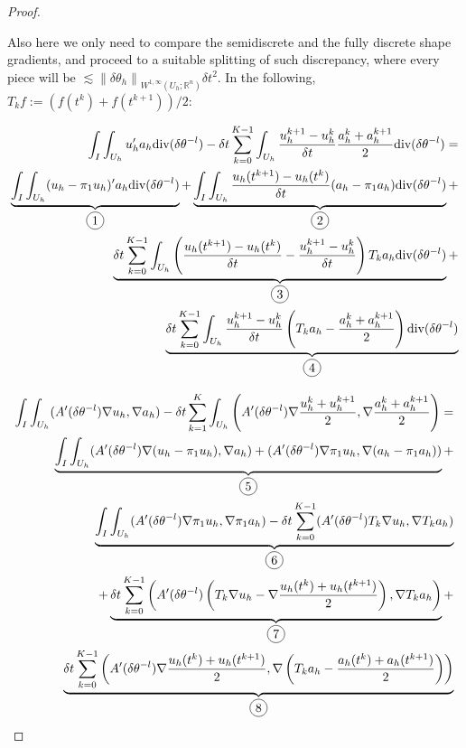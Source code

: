 \documentclass[english,a4paper,10pt,oneside]{scrbook}	%
\theoremstyle{break}
\newenvironment{mproof}[1][\proofname]{%
  \begin{proof}[#1]$ $\par\nobreak\ignorespaces
}{%
  \end{proof}
}
\renewcommand*{\proofname}{Proof}
\theoremstyle{remark}
\newcommand{\mR}{\mathbb{R}}
\newcommand{\norm}[1]{\left\lVert#1\right\rVert}
\newcommand{\te}{\theta}
\newcommand{\dive}{\text{div}}
\newcommand*\circled[1]{\tikz[baseline=(char.base)]{
            \node[shape=circle,draw,inner sep=2pt] (char) {#1};}}
\begin{document}
\begin{mproof}
Also here we only need to compare the semidiscrete and the fully discrete shape gradients, and proceed to a suitable splitting of such discrepancy, where every piece will be $\lesssim \norm{\delta \te_h}_{W^{1,\infty}(U_h;\mR^n)} \delta t^2$. In the following, $T_k f := (f(t^k)+f(t^{k+1}))/2$:

\begin{align*}
\int_I\int_{U_h}u_h'a_h\dive(\delta \te^{-l})-\delta t \sum_{k=0}^{K-1} \int_{U_h} \frac{u_h^{k+1}-u_h^{k}}{\delta t}\frac{a_h^k+a_h^{k+1}}{2} \dive(\delta \te^{-l}) =  \\
\underbrace{\int_I\int_{U_h}(u_h-\pi_1 u_h)'a_h\dive(\delta \te^{-l})}_{\circled{1}} + \underbrace{\int_I\int_{U_h}\frac{u_h(t^{k+1})-u_h(t^{k})}{\delta t} (a_h-\pi_1 a_h)\dive(\delta \te^{-l})}_{\circled{2}} +\\
\underbrace{\delta t \sum_{k=0}^{K-1} \int_{U_h}\left (\frac{u_h(t^{k+1})-u_h(t^{k})}{\delta t} - \frac{u_h^{k+1}-u_h^{k}}{\delta t}\right)  T_k a_h   \dive(\delta \te^{-l})}_{\circled{3}} +\\ \underbrace{ \delta t \sum_{k=0}^{K-1} \int_{U_h}\frac{u_h^{k+1}-u_h^{k}}{\delta t} \left ( T_k a_h 
- \frac{a_h^k+a_h^{k+1}}{2}\right )  \dive(\delta \te^{-l})}_{\circled{4}} 
\end{align*}

\begin{align*}
\int_I \int_{U_h} (A'(\delta \te^{-l})\nabla u_h,\nabla a_h) - \delta t \sum_{k=1}^K \int_{U_h} \left(A'(\delta \te^{-l})\nabla \frac{u_h^k+ u_h^{k+1}}{2} ,\nabla \frac{a_h^{k}+a_h^{k+1}}{2}\right ) = \\
\underbrace{\int_I \int_{U_h} (A'(\delta \te^{-l})\nabla (u_h-\pi_1 u_h),\nabla a_h) +  (A'(\delta \te^{-l})\nabla \pi_1 u_h,\nabla (a_h-\pi_1 a_h))}_{\circled{5}}+\\\underbrace{\int_I \int_{U_h} (A'(\delta \te^{-l})\nabla \pi_1 u_h,\nabla \pi_1 a_h)- \delta t \sum_{k=0}^{K-1} (A'(\delta \te^{-l})T_k \nabla u_h,\nabla T_k a_h)}_{\circled{6}} \\ 
+\underbrace{\delta t \sum_{k=0}^{K-1} \left (A'(\delta \te^{-l})\left ( T_k \nabla u_h - \nabla \frac{u_h(t^{k})+u_h(t^{k+1})}{2}\right) ,\nabla T_k a_h\right )}_{\circled{7}} +\\ \underbrace{\delta t \sum_{k=0}^{K-1} \left (A'(\delta \te^{-l})\nabla \frac{u_h(t^{k})+u_h(t^{k+1})}{2},\nabla \left ( T_k a_h - \frac{a_h(t^{k})+a_h(t^{k+1})}{2} \right)\right )}_{\circled{8}}
\end{align*}


\end{mproof}
\end{document}

